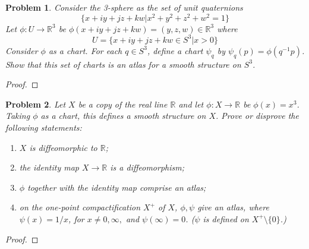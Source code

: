 \documentclass[10pt]{article}
\newcommand{\sk}{\vskip 10mm}
\newcommand{\bb}[1]{\mathbb{#1}}
\theoremstyle{plain}
\newtheorem{problem}{Problem}
\theoremstyle{remark}
\begin{document}
\begin{problem}
  Consider the 3-sphere as the set of unit quaternions
  \[ \{x+iy+jz+kw|x^2+y^2+z^2+w^2=1\} \]
  Let $\phi:U\rightarrow\bb{R}^3$ be $\phi(x+iy+jz+kw)=(y,z,w)\in\bb{R}^3$ where
  \[ U=\{x+iy+jz+kw\in S^3|x>0\} \]
  Consider $\phi$ as a chart. For each $q\in S^3$, define a chart $\psi_q$ by
  $\psi_q(p)=\phi(q^{-1}p)$. Show that this set of charts is an atlas for a
  smooth structure on $S^3$.
\end{problem}

\begin{proof}
  
\end{proof}

\sk

\begin{problem}
  Let $X$ be a copy of the real line $\bb{R}$ and let $\phi:X\rightarrow\bb{R}$ be
  $\phi(x)=x^3$. Taking $\phi$ as a chart, this defines a smooth structure on
  $X$. Prove or disprove the following statements:
  \begin{enumerate}
  \item $X$ is diffeomorphic to $\bb{R}$;
  \item the identity map $X\rightarrow\bb{R}$ is a diffeomorphism;
  \item $\phi$ together with the identity map comprise an atlas;
  \item on the one-point compactification $X^+$ of $X$, $\phi,\psi$ give an
    atlas, where $\psi(x)=1/x$, for $x\neq 0,\infty,$ and $\psi(\infty)=0$. ($\psi$ is defined
    on $X^+\setminus\{0\}$.)
  \end{enumerate}
\end{problem}

\begin{proof}
  
\end{proof}

\end{document}
